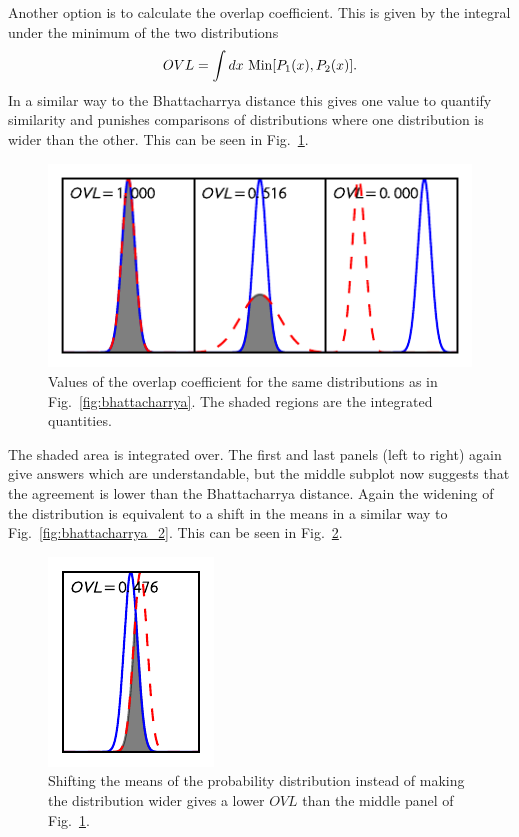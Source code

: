 \documentclass[twocolumn]{revtex4-1}
\begin{document}
    \\
    \\
    Another option is to calculate the overlap coefficient.
    This is given by the integral under the minimum of the two distributions
    \begin{equation}
        OVL = \int dx~{\rm Min}[P_1(x), P_2(x)].
    \end{equation}
    In a similar way to the Bhattacharrya distance this gives one value to quantify similarity and punishes comparisons of distributions where one distribution is wider than the other.
    This can be seen in Fig.~\ref{fig:overlap}.
    \begin{figure}
        \centering
        \includegraphics{../comparison/plots/overlap.pdf}
        \caption{Values of the overlap coefficient for the same distributions as in Fig.~\ref{fig:bhattacharrya}. The shaded regions are the integrated quantities.}
        \label{fig:overlap}
    \end{figure}
    \noindent The shaded area is integrated over.
    The first and last panels (left to right) again give answers which are understandable, but the middle subplot now suggests that the agreement is lower than the Bhattacharrya distance.
    Again the widening of the distribution is equivalent to a shift in the means in a similar way to Fig.~\ref{fig:bhattacharrya_2}.
    This can be seen in Fig.~\ref{fig:overlap_2}.
    \begin{figure}
        \centering
        \includegraphics{../comparison/plots/overlap_2.pdf}
        \caption{Shifting the means of the probability distribution instead of making the distribution wider gives a lower $OVL$ than the middle panel of Fig.~\ref{fig:overlap}.}
        \label{fig:overlap_2}
    \end{figure}
\end{document}
